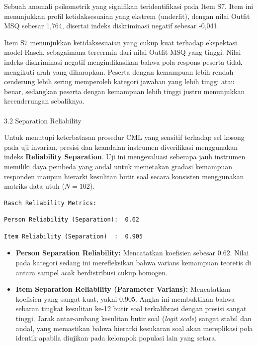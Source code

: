 \documentclass[
]{article}
\makeatletter
\let\oldparagraph\paragraph
\renewcommand{\paragraph}{
    \@ifstar
      \xxxParagraphStar
      \xxxParagraphNoStar
  }
\newcommand{\xxxParagraphStar}[1]{\oldparagraph*{#1}\mbox{}}
\newcommand{\xxxParagraphNoStar}[1]{\oldparagraph{#1}\mbox{}}
\providecommand{\tightlist}{%
  \setlength{\itemsep}{0pt}\setlength{\parskip}{0pt}}
\makeatother
\begin{document}
Sebuah anomali psikometrik yang signifikan teridentifikasi pada Item S7.
Item ini menunjukkan profil ketidaksesuaian yang ekstrem (underfit),
dengan nilai Outfit MSQ sebesar 1,764, disertai indeks diskriminasi
negatif sebesar -0,041.

Item S7 menunjukkan ketidaksesuaian yang cukup kuat terhadap ekspektasi
model Rasch, sebagaimana tercermin dari nilai Outfit MSQ yang tinggi.
Nilai indeks diskriminasi negatif mengindikasikan bahwa pola respons
peserta tidak mengikuti arah yang diharapkan. Peserta dengan kemampuan
lebih rendah cenderung lebih sering memperoleh kategori jawaban yang
lebih tinggi atau benar, sedangkan peserta dengan kemampuan lebih tinggi
justru menunjukkan kecenderungan sebaliknya.

\paragraph{3.2 Separation Reliability}\label{separation-reliability}

Untuk menutupi keterbatasan prosedur CML yang sensitif terhadap sel
kosong pada uji invarian, presisi dan keandalan instrumen diverifikasi
menggunakan indeks \textbf{Reliability Separation}. Uji ini mengevaluasi
seberapa jauh instrumen memiliki daya pembeda yang andal untuk memetakan
gradasi kemampuan responden maupun hierarki kesulitan butir soal secara
konsisten menggunakan matriks data utuh (\(N = 102\)).

\begin{verbatim}
Rasch Reliability Metrics:
\end{verbatim}

\begin{verbatim}
Person Reliability (Separation):  0.62 
\end{verbatim}

\begin{verbatim}
Item Reliability (Separation)  :  0.905 
\end{verbatim}

\begin{itemize}
\tightlist
\item
  \textbf{Person Separation Reliability:} Mencatatkan koefisien sebesar
  \(0.62\). Nilai pada kategori sedang ini merefleksikan bahwa varians
  kemampuan teoretis di antara sampel acak berdistribusi cukup homogen.
\end{itemize}

\begin{itemize}
\tightlist
\item
  \textbf{Item Separation Reliability (Parameter Varians):} Mencatatkan
  koefisien yang sangat kuat, yakni \(0.905\). Angka ini membuktikan
  bahwa sebaran tingkat kesulitan ke-12 butir soal terkalibrasi dengan
  presisi sangat tinggi. Jarak antar-ambang kesulitan butir soal
  (\emph{logit scale}) sangat stabil dan andal, yang memastikan bahwa
  hierarki kesukaran soal akan mereplikasi pola identik apabila diujikan
  pada kelompok populasi lain yang setara.
\end{itemize}
\end{document}
